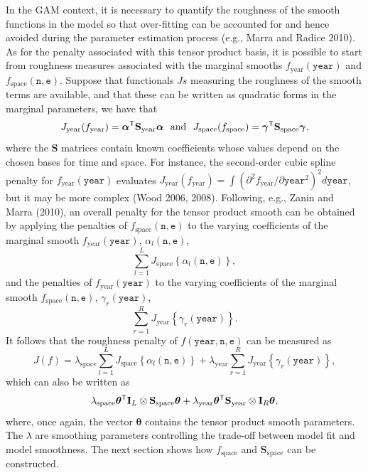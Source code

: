 \documentclass[10pt] {article}
\newcommand{\ts}{^{\sf T}}
\theoremstyle{definition}
\theoremstyle{plain}
\begin{document}
In the GAM context, it is necessary to quantify the roughness of the smooth functions in the model so that over-fitting can be accounted for and hence avoided during the parameter estimation process (e.g., Marra and Radice 2010). As for the penalty associated with this tensor product basis, it is possible to start from roughness measures associated with the marginal smooths $f_\text{year}(\texttt{year})$ and $f_\text{space}(\texttt{n},\texttt{e})$. Suppose that functionals $Js$ measuring the roughness of the smooth terms are available, and that these can be written as quadratic forms in the marginal parameters, we have that
$$
J_\text{year}(f_\text{year})=\bm\alpha\ts\textbf{S}_\text{year}\bm\alpha \ \ \text{and} \ \ J_\text{space}(f_\text{space})=\bm\gamma\ts\textbf{S}_\text{space}\bm\gamma,
$$
where the $\textbf{S}$ matrices contain known coefficients whose values depend on the chosen bases for time and space. For instance, the second-order cubic spline penalty for $f_\text{year}(\texttt{year})$ evaluates $J_\text{year}(f_\text{year})=\int\left( \partial^2 f_\text{year}/\partial \texttt{year}^2 \right)^2 d\texttt{year}$, but it may be more complex (Wood 2006, 2008). Following, e.g., Zanin and Marra (2010), an overall penalty for the tensor product smooth can be obtained by applying the penalties of $f_\text{space}(\texttt{n},\texttt{e})$ to the varying coefficients of the marginal smooth $f_\text{year}(\texttt{year})$, $\alpha_l(\texttt{n},\texttt{e})$,
$$
\sum_{l=1}^L J_\text{space}\left\{  \alpha_l(\texttt{n},\texttt{e}) \right\},
$$ 
and the penalties of $f_\text{year}(\texttt{year})$ to the varying coefficients of the marginal smooth $f_\text{space}(\texttt{n},\texttt{e})$, $\gamma_r(\texttt{year})$,  
$$
\sum_{r=1}^R J_\text{year}\left\{  \gamma_r(\texttt{year}) \right\}.
$$ 
It follows that the roughness penalty of $f(\texttt{year},\texttt{n},\texttt{e})$ can be measured as 
$$
J(f)=\lambda_\text{space} \sum_{l=1}^L J_\text{space}\left\{  \alpha_l(\texttt{n},\texttt{e}) \right\} + \lambda_\text{year} \sum_{r=1}^R J_\text{year}\left\{  \gamma_r(\texttt{year}) \right\},
$$
which can also be written as
$$
\lambda_\text{space} \bm\theta\ts \textbf{I}_L \otimes \textbf{S}_\text{space} \bm\theta + \lambda_\text{year} \bm\theta\ts \textbf{S}_\text{year} \otimes \textbf{I}_R  \bm\theta,
$$
where, once again, the vector $\bm\theta$ contains the tensor product smooth parameters. The $\lambda$ are smoothing parameters controlling the trade-off between model fit and model smoothness. The next section shows how $f_\text{space}$ and $\textbf{S}_\text{space}$ can be constructed.   
\end{document}
